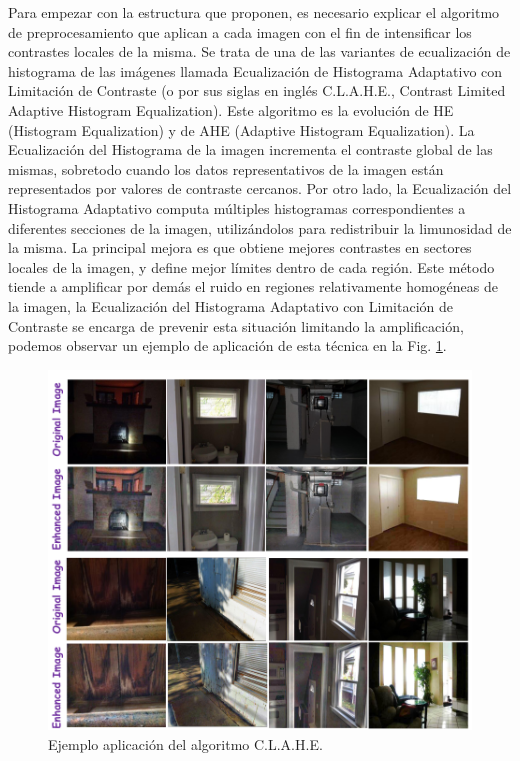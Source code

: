 Para empezar con la estructura que proponen, es necesario explicar el algoritmo de preprocesamiento que aplican a cada imagen con el fin de intensificar los contrastes locales de la misma. Se trata de una de las variantes de ecualización de histograma de las imágenes llamada Ecualización de Histograma Adaptativo con Limitación de Contraste (o por sus siglas en inglés C.L.A.H.E., Contrast Limited Adaptive Histogram Equalization). Este algoritmo es la evolución de HE (Histogram Equalization) y de AHE (Adaptive Histogram Equalization). 
La Ecualización del Histograma de la imagen incrementa el contraste global de las mismas, sobretodo cuando los datos representativos de la imagen están representados por valores de contraste cercanos.
Por otro lado, la Ecualización del Histograma Adaptativo computa múltiples histogramas correspondientes a diferentes secciones de la imagen, utilizándolos para redistribuir la limunosidad de la misma. La principal mejora es que obtiene mejores contrastes en sectores locales de la imagen, y define mejor límites dentro de cada región.
Este método tiende a amplificar por demás el ruido en regiones relativamente homogéneas de la imagen, la Ecualización del Histograma Adaptativo con Limitación de Contraste se encarga de prevenir esta situación limitando la amplificación, podemos observar un ejemplo de aplicación de esta técnica en la Fig. \ref{fig:lstmclaheexample}.
\begin{figure}[h]
	\centering
	\includegraphics[width=1\linewidth, height=0.5\textheight]{images/lstm_clahe_example}
	\caption[Ejemplo aplicación del algoritmo C.L.A.H.E.]{Ejemplo aplicación del algoritmo C.L.A.H.E.}
	\label{fig:lstmclaheexample}
\end{figure}

